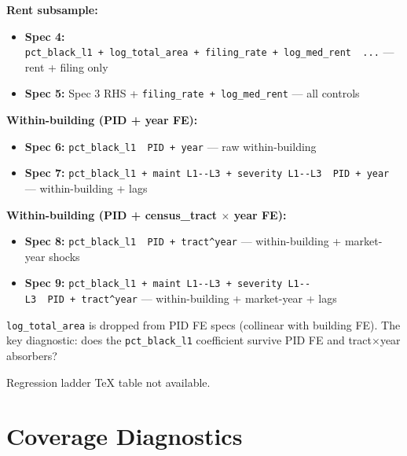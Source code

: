 \documentclass[
  10pt,
]{article}
\providecommand{\tightlist}{%
  \setlength{\itemsep}{0pt}\setlength{\parskip}{0pt}}
\begin{document}
\textbf{Rent subsample:}

\begin{itemize}
\tightlist
\item
  \textbf{Spec 4:}
  \texttt{pct\_black\_l1\ +\ log\_total\_area\ +\ filing\_rate\ +\ log\_med\_rent\ \textbar{}\ ...}
  --- rent + filing only
\item
  \textbf{Spec 5:} Spec 3 RHS + \texttt{filing\_rate\ +\ log\_med\_rent}
  --- all controls
\end{itemize}

\textbf{Within-building (PID + year FE):}

\begin{itemize}
\tightlist
\item
  \textbf{Spec 6:} \texttt{pct\_black\_l1\ \textbar{}\ PID\ +\ year} ---
  raw within-building
\item
  \textbf{Spec 7:}
  \texttt{pct\_black\_l1\ +\ maint\ L1-\/-L3\ +\ severity\ L1-\/-L3\ \textbar{}\ PID\ +\ year}
  --- within-building + lags
\end{itemize}

\textbf{Within-building (PID + census\_tract \(\times\) year FE):}

\begin{itemize}
\tightlist
\item
  \textbf{Spec 8:}
  \texttt{pct\_black\_l1\ \textbar{}\ PID\ +\ tract\^{}year} ---
  within-building + market-year shocks
\item
  \textbf{Spec 9:}
  \texttt{pct\_black\_l1\ +\ maint\ L1-\/-L3\ +\ severity\ L1-\/-L3\ \textbar{}\ PID\ +\ tract\^{}year}
  --- within-building + market-year + lags
\end{itemize}

\texttt{log\_total\_area} is dropped from PID FE specs (collinear with
building FE). The key diagnostic: does the \texttt{pct\_black\_l1}
coefficient survive PID FE and tract\(\times\)year absorbers?

Regression ladder TeX table not available.

\section{Coverage Diagnostics}\label{coverage-diagnostics}

\begingroup\fontsize{9}{11}\selectfont
\end{document}
